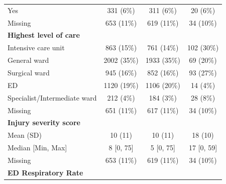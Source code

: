 \documentclass[12pt, a4paper]{article}
\begin{document}
\begin{table}[t!]
{\begin{tabular}{lccc}
            \hspace{3mm}Yes                               & 331 (6\%)         & 311 (6\%)         & 20 (6\%)         \\
            \hspace{3mm}Missing                           & 653 (11\%)        & 619 (11\%)        & 34 (10\%)        \\
            \textbf{Highest level of care}                &                   &                   &                  \\
            \hspace{3mm}Intensive care unit               & 863 (15\%)        & 761 (14\%)        & 102 (30\%)       \\
            \hspace{3mm}General ward                      & 2002 (35\%)       & 1933 (35\%)       & 69 (20\%)        \\
            \hspace{3mm}Surgical ward                     & 945 (16\%)        & 852 (16\%)        & 93 (27\%)        \\
            \hspace{3mm}ED                                & 1120 (19\%)       & 1106 (20\%)       & 14 (4\%)         \\
            \hspace{3mm}Specialist/Intermediate ward      & 212 (4\%)         & 184 (3\%)         & 28 (8\%)         \\
            \hspace{3mm}Missing                           & 651 (11\%)        & 617 (11\%)        & 34 (10\%)        \\
            \textbf{Injury severity score}                &                   &                   &                  \\
            \hspace{3mm}Mean (SD)                         & 10 (11)           & 10 (11)           & 18 (10)          \\
            \hspace{3mm}Median [Min, Max]                 & 8 [0, 75]         & 5 [0, 75]         & 17 [0, 59]       \\
            \hspace{3mm}Missing                           & 653 (11\%)        & 619 (11\%)        & 34 (10\%)        \\
            \textbf{ED Respiratory Rate}                  &                   &                   &                  \\

\end{tabular}}
\end{table}
\end{document}
